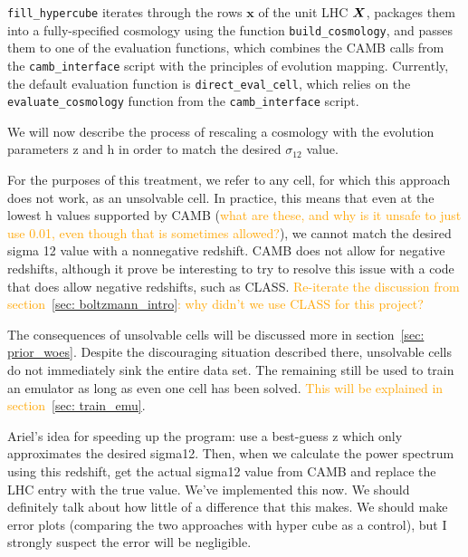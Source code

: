 
\verb|fill_hypercube| iterates through the rows $\bm{x}$ of the unit LHC
$\bm{X}$, packages them into a fully-specified cosmology using the function
\verb|build_cosmology|, and passes them to one of the evaluation functions,
which combines the CAMB calls from the \verb|camb_interface| script with the
principles of evolution mapping. Currently, the default evaluation function is
\verb|direct_eval_cell|, which relies on the \verb|evaluate_cosmology|
function from the \verb|camb_interface| script.

% 


We will now describe the process of rescaling a cosmology with the evolution 
parameters z and h in order to match the desired $\sigma_{12}$ value.

For the purposes of this treatment, we refer to any cell, for which this 
approach does not work, as an unsolvable cell. In practice, this means that 
even at the lowest h values supported by CAMB (\textcolor{orange}{what are 
these, and why is it unsafe to just use 0.01, even though that is sometimes 
allowed?}), we cannot match the desired sigma 12 value with a nonnegative 
redshift. CAMB does not allow for negative redshifts, although it prove be 
interesting to try to resolve this issue with a code that does allow negative 
redshifts, such as CLASS. \textcolor{orange}{Re-iterate the discussion from
section~\ref{sec: boltzmann_intro}: why didn’t we use CLASS for this project?}


The consequences of unsolvable cells will be discussed more in
section~\ref{sec: prior_woes}. Despite the discouraging situation described 
there,
unsolvable cells do not immediately sink the entire data set. The remaining
still be used to train an emulator as long as even one cell has been solved.
\textcolor{orange}{This will be explained in section~\ref{sec: train_emu}}.


Ariel’s idea for speeding up the program: use a best-guess z which only approximates the desired sigma12. Then, when we calculate the power spectrum using this redshift, get the actual sigma12 value from CAMB and replace the LHC entry with the true value.
We’ve implemented this now. We should definitely talk about how little of a difference that this makes. We should make error plots (comparing the two approaches with hyper cube as a control), but I strongly suspect the error will be negligible.


